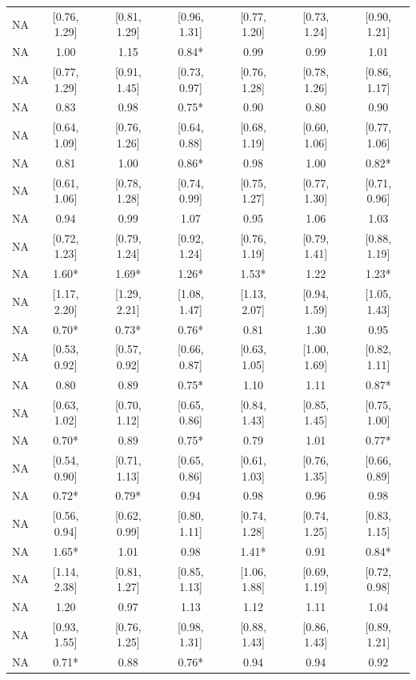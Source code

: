 \documentclass[man]{apa6}
\begin{document}
\begin{center}
\begin{ThreePartTable}
{\begin{longtable}{lcccccc}
NA & [0.76, 1.29] & [0.81, 1.29] & [0.96, 1.31] & [0.77, 1.20] & [0.73, 1.24] & [0.90, 1.21]\\
NA & 1.00 & 1.15 & 0.84* & 0.99 & 0.99 & 1.01\\
NA & [0.77, 1.29] & [0.91, 1.45] & [0.73, 0.97] & [0.76, 1.28] & [0.78, 1.26] & [0.86, 1.17]\\
NA & 0.83 & 0.98 & 0.75* & 0.90 & 0.80 & 0.90\\
NA & [0.64, 1.09] & [0.76, 1.26] & [0.64, 0.88] & [0.68, 1.19] & [0.60, 1.06] & [0.77, 1.06]\\
NA & 0.81 & 1.00 & 0.86* & 0.98 & 1.00 & 0.82*\\
NA & [0.61, 1.06] & [0.78, 1.28] & [0.74, 0.99] & [0.75, 1.27] & [0.77, 1.30] & [0.71, 0.96]\\
NA & 0.94 & 0.99 & 1.07 & 0.95 & 1.06 & 1.03\\
NA & [0.72, 1.23] & [0.79, 1.24] & [0.92, 1.24] & [0.76, 1.19] & [0.79, 1.41] & [0.88, 1.19]\\
NA & 1.60* & 1.69* & 1.26* & 1.53* & 1.22 & 1.23*\\
NA & [1.17, 2.20] & [1.29, 2.21] & [1.08, 1.47] & [1.13, 2.07] & [0.94, 1.59] & [1.05, 1.43]\\
NA & 0.70* & 0.73* & 0.76* & 0.81 & 1.30 & 0.95\\
NA & [0.53, 0.92] & [0.57, 0.92] & [0.66, 0.87] & [0.63, 1.05] & [1.00, 1.69] & [0.82, 1.11]\\
NA & 0.80 & 0.89 & 0.75* & 1.10 & 1.11 & 0.87*\\
NA & [0.63, 1.02] & [0.70, 1.12] & [0.65, 0.86] & [0.84, 1.43] & [0.85, 1.45] & [0.75, 1.00]\\
NA & 0.70* & 0.89 & 0.75* & 0.79 & 1.01 & 0.77*\\
NA & [0.54, 0.90] & [0.71, 1.13] & [0.65, 0.86] & [0.61, 1.03] & [0.76, 1.35] & [0.66, 0.89]\\
NA & 0.72* & 0.79* & 0.94 & 0.98 & 0.96 & 0.98\\
NA & [0.56, 0.94] & [0.62, 0.99] & [0.80, 1.11] & [0.74, 1.28] & [0.74, 1.25] & [0.83, 1.15]\\
NA & 1.65* & 1.01 & 0.98 & 1.41* & 0.91 & 0.84*\\
NA & [1.14, 2.38] & [0.81, 1.27] & [0.85, 1.13] & [1.06, 1.88] & [0.69, 1.19] & [0.72, 0.98]\\
NA & 1.20 & 0.97 & 1.13 & 1.12 & 1.11 & 1.04\\
NA & [0.93, 1.55] & [0.76, 1.25] & [0.98, 1.31] & [0.88, 1.43] & [0.86, 1.43] & [0.89, 1.21]\\
NA & 0.71* & 0.88 & 0.76* & 0.94 & 0.94 & 0.92\\

\end{longtable}}
\end{ThreePartTable}
\end{center}
\end{document}
